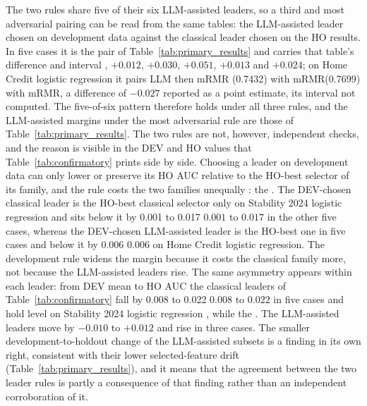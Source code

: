 \documentclass[final,5p,twocolumn]{elsarticle}
\providecommand{\DIFaddtex}[1]{{\protect\color{blue} \sf #1}} %
\providecommand{\DIFdeltex}[1]{{\protect\color{red} \scriptsize #1}} %
\providecommand{\DIFaddbegin}{} %
\providecommand{\DIFaddend}{} %
\providecommand{\DIFdelbegin}{} %
\providecommand{\DIFdelend}{} %
\providecommand{\DIFadd}[1]{\texorpdfstring{\DIFaddtex{#1}}{#1}} %
\providecommand{\DIFdel}[1]{\texorpdfstring{\DIFdeltex{#1}}{}} %
\begin{document}
The two rules share five of their six LLM-assisted leaders, so a third and most adversarial pairing can be read from the same tables: the LLM-assisted leader chosen on development data against the classical leader chosen on the HO results. In five cases it is the pair of Table~\ref{tab:primary_results} and carries that table's difference and interval\DIFdelbegin \DIFdel{, $+0.012$, $+0.030$, $+0.051$, $+0.013$ and $+0.024$}\DIFdelend ; on Home Credit logistic regression it pairs LLM then mRMR \DIFdelbegin \DIFdel{(0.7432) with mRMR(0.7699)}\DIFdelend \DIFaddbegin \DIFadd{with mRMR}\DIFaddend , a difference of $-0.027$ reported as a point estimate, its interval not computed. The five-of-six pattern therefore holds under all three rules, and the LLM-assisted margins under the most adversarial rule are those of Table~\ref{tab:primary_results}. The two rules are not, however, independent checks, and the reason is visible in the DEV and HO values that Table~\ref{tab:confirmatory} prints side by side. Choosing a leader on development data can only lower or preserve its HO AUC relative to the HO-best selector of its family, and the rule costs the two families unequally\DIFdelbegin \DIFdel{: the }\DIFdelend \DIFaddbegin \DIFadd{. The }\DIFaddend DEV-chosen classical leader is the HO-best classical selector only on Stability 2024 logistic regression and sits below it by \DIFdelbegin \DIFdel{0.001 to 0.017 }\DIFdelend \DIFaddbegin \DIFadd{$0.001$ to $0.017$ }\DIFaddend in the other five cases, whereas the DEV-chosen LLM-assisted leader is the HO-best one in five cases and below it by \DIFdelbegin \DIFdel{0.006 }\DIFdelend \DIFaddbegin \DIFadd{$0.006$ }\DIFaddend on Home Credit logistic regression. The development rule widens the margin because it costs the classical family more, not because the LLM-assisted leaders rise. The same asymmetry appears within each leader: from DEV mean to HO AUC the classical leaders of Table~\ref{tab:confirmatory} fall by \DIFdelbegin \DIFdel{0.008 to 0.022 }\DIFdelend \DIFaddbegin \DIFadd{$0.008$ to $0.022$ }\DIFaddend in five cases and hold level on Stability 2024 logistic regression\DIFdelbegin \DIFdel{, while the }\DIFdelend \DIFaddbegin \DIFadd{. The }\DIFaddend LLM-assisted leaders move by $-0.010$ to $+0.012$ and rise in three cases. The smaller development-to-holdout change of the LLM-assisted subsets is a finding in its own right, consistent with their lower selected-feature drift (Table~\ref{tab:primary_results}), and it means that the agreement between the two leader rules is partly a consequence of that finding rather than an independent corroboration of it.
\end{document}
